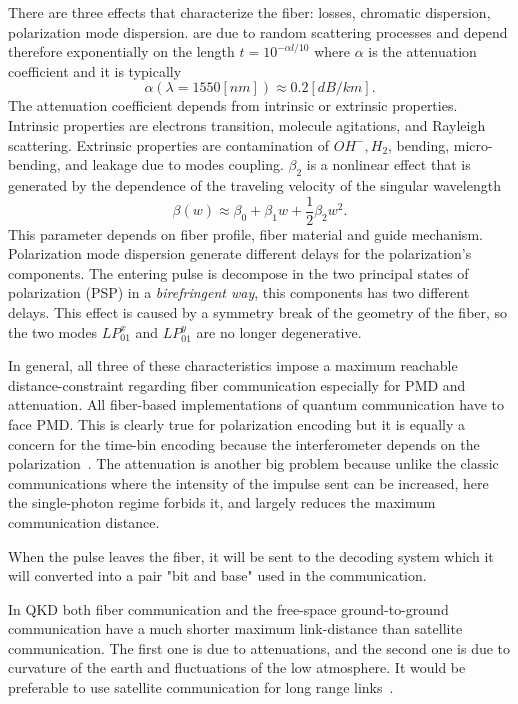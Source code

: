 There are three effects that characterize the fiber: losses, chromatic dispersion, polarization mode dispersion.  are due to random scattering processes and depend therefore exponentially on the length $t = 10^{-\alpha l / 10}$ where $\alpha$ is the attenuation coefficient and it is typically
\begin{equation}
  \alpha(\lambda = 1550[nm]) \approx 0.2 [dB / km].
\end{equation}
The attenuation coefficient depends from intrinsic or extrinsic properties. Intrinsic properties are electrons transition, molecule agitations, and Rayleigh scattering. Extrinsic properties are contamination of $OH^-, H_2$, bending, micro-bending, and leakage due to modes coupling.  $\beta_2$ is a nonlinear effect that is generated by the dependence of the traveling velocity of the singular wavelength
\begin{equation}
  \beta(w) \approx \beta_0 + \beta_1 w + \frac{1}{2} \beta_2 w^2.
\end{equation}
This parameter depends on fiber profile, fiber material and guide mechanism. Polarization mode dispersion  generate different delays for the polarization's components. The entering pulse is decompose in the two principal states of polarization (PSP) in a \textit{birefringent way}, this components has two different delays. This effect is caused by a symmetry break of the geometry of the fiber, so the two modes $LP_{01}^x$ and $LP_{01}^y$ are no longer degenerative.

In general, all three of these characteristics impose a maximum reachable distance-constraint regarding fiber communication especially for PMD and attenuation. All fiber-based implementations of quantum communication have to face PMD. This is clearly true for polarization encoding but it is equally a concern for the time-bin encoding because the interferometer depends on the polarization~\cite{a25}. The attenuation is another big problem because unlike the classic communications where the intensity of the impulse sent can be increased, here the single-photon regime forbids it, and largely reduces the maximum communication distance.

When the pulse leaves the fiber, it will be sent to the decoding system which it will converted into a pair "bit and base" used in the communication.


In QKD both fiber communication and the free-space ground-to-ground communication have a much shorter maximum link-distance than satellite communication. The first one is due to attenuations, and the second one is due to curvature of the earth and fluctuations of the low atmosphere. It would be preferable to use satellite communication for long range links~\cite{a14}.


